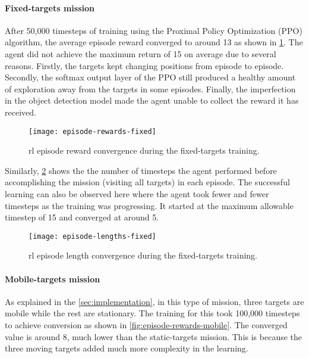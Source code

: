 \documentclass[../main.tex]{subfiles}
\begin{document}
\paragraph{Fixed-targets mission}

After 50,000 timesteps of training using the Proximal Policy
Optimization (PPO) algorithm, the average episode reward converged
to around 13 as shown in \cref{fig:episode-rewards-fixed}.
The agent did not achieve the maximum return of 15
on average
due to several reasons. Firstly, the
targets kept changing positions from episode to episode.
Secondly, the softmax output layer of the PPO still produced 
a healthy amount
of exploration away from the targets in some episodes.
Finally, the imperfection in the object detection model made
the agent unable to collect the reward it has received. 

\begin{figure}[tbp]
	\centering
	\texttt{[image: episode-rewards-fixed]}
        \caption{\gls{rl} episode reward convergence during the
        fixed-targets training.}
        \label{fig:episode-rewards-fixed}
\end{figure}

Similarly, \cref{fig:episode-lengths-fixed} shows the the number of
timesteps the agent performed before accomplishing the mission
(visiting all targets) in each episode.
The successful learning can also be observed here where the agent took
fewer and fewer timesteps as the training was progressing.
It started at the maximum allowable timestep of 15 and converged at
around 5.

\begin{figure}[tbp]
	\centering
	\texttt{[image: episode-lengths-fixed]}
        \caption{\gls{rl} episode length convergence during the
        fixed-targets training.}
        \label{fig:episode-lengths-fixed}
\end{figure}

\paragraph{Mobile-targets mission}

As explained in the \cref{sec:implementation}, in this type of
mission, three targets are mobile while the rest are stationary.
The training for this took 100,000 timesteps to achieve conversion as
shown in \cref{fig:episode-rewards-mobile}.
The converged value is around 8, much lower than the static-targets
mission.
This is because the three moving targets added much more complexity in the
learning.
\end{document}
